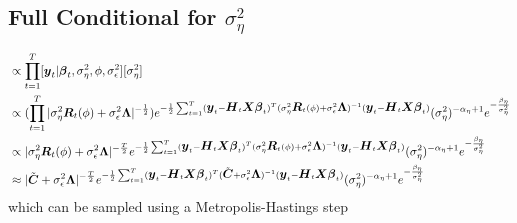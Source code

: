 \documentclass[fleqn]{article}
\def\bm#1{\mbox{\boldmath $#1$}}
\begin{document}
\subsection{Full Conditional for $\sigma^2_\eta$}
%
\begin{align*}
[\sigma^2_\eta | \cdot] & \propto \prod_{t = 1}^T [\bm{y}_t | \bm{\beta}_t, \sigma^2_\eta, \phi, \sigma^2_\epsilon] [\sigma^2_\eta]\\
%
& \propto (\prod_{t = 1}^T |\sigma^2_\eta \bm{R}_t(\phi) + \sigma^2_\epsilon \bm{\Lambda} |^{ - \frac{1} {2}}) e^{ - \frac{1} {2} \sum_{t = 1}^T (\bm{y}_t - \bm{H}_t \bm{X} \bm{\beta}_t)^T (\sigma^2_\eta \bm{R}_t(\phi) + \sigma^2_\epsilon \bm{\Lambda})^{ - 1} (\bm{y}_t - \bm{H}_t \bm{X} \bm{\beta}_t)} (\sigma^2_\eta)^{ - \alpha_\eta + 1} e^{ - \frac{\beta_\eta} {\sigma^2_\eta}}\\
%
& \propto |\sigma^2_\eta \bm{R}_t(\phi) + \sigma^2_\epsilon \bm{\Lambda} |^{ - \frac{T} {2}} e^{ - \frac{1} {2} \sum_{t = 1}^T (\bm{y}_t - \bm{H}_t \bm{X} \bm{\beta}_t)^T (\sigma^2_\eta \bm{R}_t(\phi) + \sigma^2_\epsilon \bm{\Lambda})^{ - 1} (\bm{y}_t - \bm{H}_t \bm{X} \bm{\beta}_t)} (\sigma^2_\eta)^{ - \alpha_\eta + 1} e^{ - \frac{\beta_\eta} {\sigma^2_\eta}}\\
%
& \approx |\tilde{\bm{C}} + \sigma^2_\epsilon \bm{\Lambda} |^{ - \frac{T} {2}} e^{ - \frac{1} {2} \sum_{t = 1}^T (\bm{y}_t - \bm{H}_t \bm{X} \bm{\beta}_t)^T (\tilde{\bm{C}} + \sigma^2_\epsilon \bm{\Lambda})^{ - 1} (\bm{y}_t - \bm{H}_t \bm{X} \bm{\beta}_t)} (\sigma^2_\eta)^{ - \alpha_\eta + 1} e^{ - \frac{\beta_\eta} {\sigma^2_\eta}}
\end{align*}
% 
which can be sampled using a Metropolis-Hastings step
%
\end{document}
